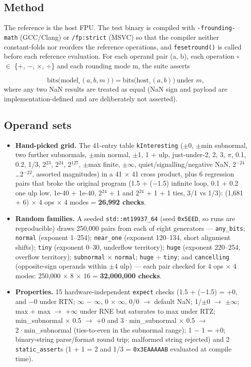 \documentclass[11pt,a4paper]{article}
\begin{document}
\subsection{Method}
The reference is the host FPU. The test binary is compiled with \texttt{-frounding-math} (GCC/Clang) or \texttt{/fp:strict} (MSVC) so that the compiler neither constant-folds nor reorders the reference operations, and \texttt{fesetround()} is called before each reference evaluation. For each operand pair (a, b), each operation $\circ$ $\in$ \{+, $-$, $\times$, $\div$\} and each rounding mode m, the suite asserts

\[\mathrm{bits}\big(\mathrm{model}_\circ(a,b,m)\big)=\mathrm{bits}\big(\mathrm{host}_\circ(a,b)\big)\ \text{under } m,\]
where any two NaN results are treated as equal (NaN sign and payload are implementation-defined and are deliberately not asserted).

\subsection{Operand sets}
\begin{itemize}[nosep]
  \item \textbf{Hand-picked grid.} The 41-entry table \texttt{kInteresting} ($\pm$0, $\pm$min subnormal, two further subnormals, $\pm$min normal, $\pm$1, 1 + ulp, just-under-2, 2, 3, $\pi$, 0.1, 0.2, 1/3, 2$^{23}$, 2$^{24}$, 2$^{127}$, $\pm$max finite, $\pm$$\infty$, quiet/signalling/negative NaN, 2$^{-24}$\dots{}2$^{-22}$, assorted magnitudes) in a 41 $\times$ 41 cross product, plus 6 regression pairs that broke the original program (1.5 + ($-$1.5) infinite loop, 0.1 + 0.2 one ulp low, 1e-40 + 1e-40, 2$^{24}$ + 1 and 2$^{24}$ + 1 + 1 ties, 3/1 vs 1/3): (1,681 + 6) $\times$ 4 ops $\times$ 4 modes = \textbf{26,992 checks}.
  \item \textbf{Random families.} A seeded \texttt{std::mt19937\_64} (seed \texttt{0x5EED}, so runs are reproducible) draws 250,000 pairs from each of eight generators — \texttt{any\_bits}; \texttt{normal} (exponent 1–254); \texttt{near\_one} (exponent 120–134, short alignment shifts); \texttt{tiny} (exponent 0–30, underflow territory); \texttt{huge} (exponent 220–254, overflow territory); \texttt{subnormal} $\times$ \texttt{normal}; \texttt{huge} $\div$ \texttt{tiny}; and \texttt{cancelling} (opposite-sign operands within $\pm$4 ulp) — each pair checked for 4 ops $\times$ 4 modes: 250,000 $\times$ 8 $\times$ 16 = \textbf{32,000,000 checks}.
  \item \textbf{Properties.} 15 hardware-independent \texttt{expect} checks (1.5 + ($-$1.5) = +0, and $-$0 under RTN; $\infty$ $-$ $\infty$, 0 $\times$ $\infty$, 0/0 $\rightarrow$ default NaN; 1/$\pm$0 $\rightarrow$ $\pm$$\infty$; max + max $\rightarrow$ +$\infty$ under RNE but saturates to max under RTZ; min\_subnormal $\times$ 0.5 $\rightarrow$ +0 and 3·min\_subnormal $\times$ 0.5 $\rightarrow$ 2·min\_subnormal (ties-to-even in the subnormal range); 1 $-$ 1 = +0; binary-string parse/format round trip; malformed string rejected) and 2 \texttt{static\_assert}s (1 + 1 = 2 and 1/3 = \texttt{0x3EAAAAAB} evaluated at compile time).
\end{itemize}
\end{document}
